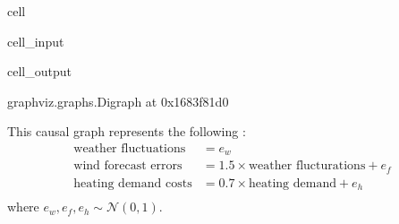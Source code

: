 \documentclass[letterpaper,10pt,english]{jupyterBook}
\begin{document}
\begin{sphinxuseclass}{cell}\begin{sphinxVerbatimInput}

\begin{sphinxuseclass}{cell_input}
\begin{sphinxVerbatim}[commandchars=\\\{\}]
  \PYG{p}{[}\PYG{p}{[}  \PYG{p}{]}
              \PYG{p}{[}  \PYG{p}{]}
              \PYG{p}{[}  \PYG{p}{]}\PYG{p}{]}

 \PYG{p}{[}  \PYG{p}{]}
\end{sphinxVerbatim}

\end{sphinxuseclass}\end{sphinxVerbatimInput}
\begin{sphinxVerbatimOutput}

\begin{sphinxuseclass}{cell_output}
\begin{sphinxVerbatim}[commandchars=\\\{\}]
\PYGZlt{}graphviz.graphs.Digraph at 0x1683f81d0\PYGZgt{}
\end{sphinxVerbatim}

\end{sphinxuseclass}\end{sphinxVerbatimOutput}

\end{sphinxuseclass}
\sphinxAtStartPar
This causal graph represents the following :
\label{equation:notebooks/basic_dag_structures:e5df486c-39cd-4224-8f9f-ae244fe62967}\begin{align}
\text{weather fluctuations} &= e_w \\
\text{wind forecast errors} &= 1.5 \times \text{weather flucturations} + e_f \\
\text{heating demand costs} &= 0.7 \times \text{heating demand} + e_h \\
\end{align}
\sphinxAtStartPar
where \(e_w, e_f, e_h \sim \mathcal{N}(0,1)\).
\end{document}

